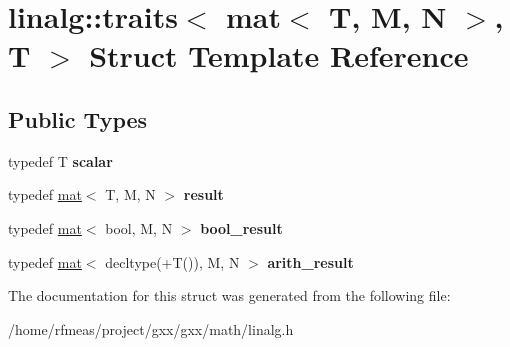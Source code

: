 \hypertarget{structlinalg_1_1traits_3_01mat_3_01T_00_01M_00_01N_01_4_00_01T_01_4}{}\section{linalg\+:\+:traits$<$ mat$<$ T, M, N $>$, T $>$ Struct Template Reference}
\label{structlinalg_1_1traits_3_01mat_3_01T_00_01M_00_01N_01_4_00_01T_01_4}
\subsection*{Public Types}
\begin{DoxyCompactItemize}
\item 
typedef T {\bfseries scalar}\hypertarget{structlinalg_1_1traits_3_01mat_3_01T_00_01M_00_01N_01_4_00_01T_01_4_a3630e670f9cc4b643218383fefeffc4e}{}\label{structlinalg_1_1traits_3_01mat_3_01T_00_01M_00_01N_01_4_00_01T_01_4_a3630e670f9cc4b643218383fefeffc4e}

\item 
typedef \hyperlink{structlinalg_1_1mat}{mat}$<$ T, M, N $>$ {\bfseries result}\hypertarget{structlinalg_1_1traits_3_01mat_3_01T_00_01M_00_01N_01_4_00_01T_01_4_a1ade3aa25dbd37c60f13986fdef61327}{}\label{structlinalg_1_1traits_3_01mat_3_01T_00_01M_00_01N_01_4_00_01T_01_4_a1ade3aa25dbd37c60f13986fdef61327}

\item 
typedef \hyperlink{structlinalg_1_1mat}{mat}$<$ bool, M, N $>$ {\bfseries bool\+\_\+result}\hypertarget{structlinalg_1_1traits_3_01mat_3_01T_00_01M_00_01N_01_4_00_01T_01_4_a9c1bf18fbae9b94c59662f5380c0e7c7}{}\label{structlinalg_1_1traits_3_01mat_3_01T_00_01M_00_01N_01_4_00_01T_01_4_a9c1bf18fbae9b94c59662f5380c0e7c7}

\item 
typedef \hyperlink{structlinalg_1_1mat}{mat}$<$ decltype(+T()), M, N $>$ {\bfseries arith\+\_\+result}\hypertarget{structlinalg_1_1traits_3_01mat_3_01T_00_01M_00_01N_01_4_00_01T_01_4_ae0594213dea7140d6cc47460b951dd8c}{}\label{structlinalg_1_1traits_3_01mat_3_01T_00_01M_00_01N_01_4_00_01T_01_4_ae0594213dea7140d6cc47460b951dd8c}

\end{DoxyCompactItemize}


The documentation for this struct was generated from the following file\+:\begin{DoxyCompactItemize}
\item 
/home/rfmeas/project/gxx/gxx/math/linalg.\+h\end{DoxyCompactItemize}
